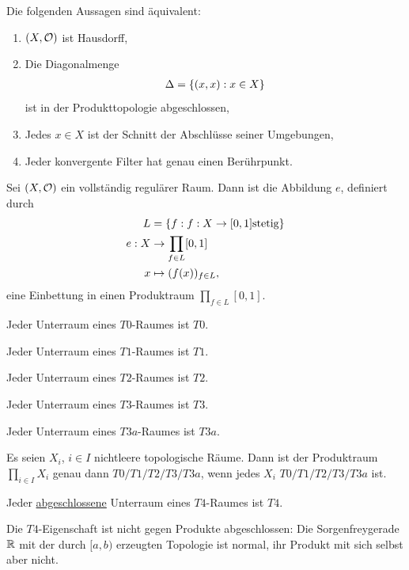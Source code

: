 \documentclass{report}
\begin{document}
\begin{theorem}
	Die folgenden Aussagen sind äquivalent:
	\begin{enumerate}
		\item $(X, \mathcal{O})$ ist Hausdorff,
		\item Die Diagonalmenge
		\begin{align*}
			\Delta = \qty{(x,x) : x \in X}
		\end{align*}
		ist in der Produkttopologie abgeschlossen,
		\item Jedes $x \in X$ ist der Schnitt der Abschlüsse seiner Umgebungen,
		\item Jeder konvergente Filter hat genau einen Berührpunkt.
	\end{enumerate}
\end{theorem}
\begin{theorem}
	Sei $(X, \mathcal{O})$ ein vollständig regulärer Raum. Dann ist die Abbildung $e$, definiert durch
	\begin{align*}
		L &= \qty{f : f : X \to [0,1] \textnormal{stetig}}\\
		e : X &\to \prod_{f \in L} [0,1]\\
		x &\mapsto (f(x))_{f \in L},
	\end{align*}
	eine Einbettung in einen Produktraum $\prod_{f \in L} [0,1]$.
\end{theorem}
\begin{theorem}
	Jeder Unterraum eines $T0$-Raumes ist $T0$.
\end{theorem}
\begin{theorem}
	Jeder Unterraum eines $T1$-Raumes ist $T1$.
\end{theorem}
\begin{theorem}
	Jeder Unterraum eines $T2$-Raumes ist $T2$.
\end{theorem}
\begin{theorem}
	Jeder Unterraum eines $T3$-Raumes ist $T3$.
\end{theorem}
\begin{theorem}
	Jeder Unterraum eines $T3a$-Raumes ist $T3a$.
\end{theorem}
\begin{corollary}
	Es seien $X_i$, $i \in I$ nichtleere topologische Räume. Dann ist der Produktraum $\prod_{i \in I} X_i$ genau dann $T0/T1/T2/T3/T3a$, wenn jedes $X_i$ $T0/T1/T2/T3/T3a$ ist.
\end{corollary}
\begin{theorem}
	Jeder \ul{abgeschlossene} Unterraum eines $T4$-Raumes ist $T4$.
\end{theorem}
\begin{theorem}
	Die $T4$-Eigenschaft ist nicht gegen Produkte abgeschlossen:
	Die Sorgenfreygerade $\mathbb{R}$ mit der durch $[a,b)$ erzeugten Topologie ist normal, ihr Produkt mit sich selbst aber nicht.
\end{theorem}
\end{document}
